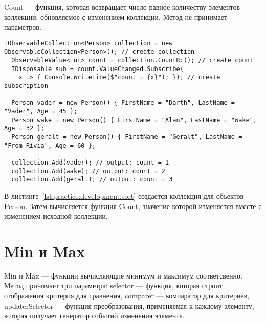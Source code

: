Count --- функция, которая возвращает число равное количеству элементов коллекции, обновляемое с изменением коллекции.
Метод не принимает параметров.

\begin{lstlisting}[style=csharpinlinestyle, caption={Пример использования Count}, label=lst:practice:development:count]
  IObservableCollection<Person> collection = new ObservableCollection<Person>(); // create collection
  ObservableValue<int> count = collection.CountRc(); // create count
  IDisposable sub = count.ValueChanged.Subscribe(
    x => { Console.WriteLine($"count = {x}"); }); // create subscription

  Person vader = new Person() { FirstName = "Darth", LastName = "Vader", Age = 45 };
  Person wake = new Person() { FirstName = "Alan", LastName = "Wake", Age = 32 };
  Person geralt = new Person() { FirstName = "Geralt", LastName = "From Rivia", Age = 60 };

  collection.Add(vader); // output: count = 1
  collection.Add(wake); // output: count = 2
  collection.Add(geralt); // output: count = 3
\end{lstlisting}

В листинге~\ref{lst:practice:development:sort} создается коллекция для объектов Person. Затем вычисляется функция Count, значение которой изменяется вместе с изменением исходной коллекции.

\section{Min и Max}
\label{sub:development:min_max}

Min и Max --- функции вычисляющие минимум и максимум соответсвенно.
Метод принимает три параметра: selector --- функция, которая строит отображения критерия для сравнения, comparer --- компаратор для критериев,
updaterSelector --- функция преобразования, применяемая к каждому элементу, которая получает генератор событий изменения элемента.

